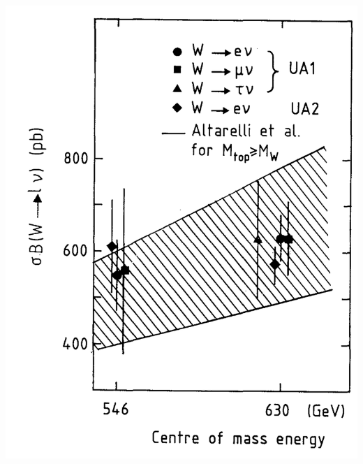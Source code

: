 \begin{frame}{}
\smaller
    \begin{center}
    \includegraphics[height=0.4\textheight]{chapters/Introduction/sectionRelatedWorks/figures/sps.png} \qquad

\end{center}
\end{frame}
